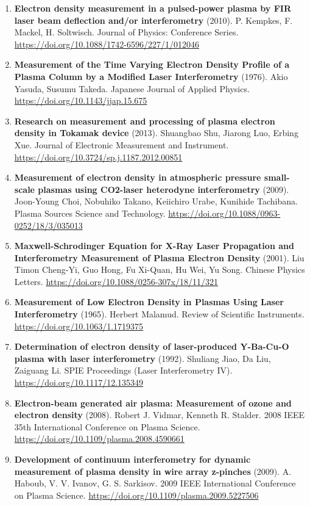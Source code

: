 \documentclass[11pt,a4paper]{article}
\begin{document}
\begin{enumerate}[leftmargin=1.4em]
\item \textbf{Electron density measurement in a pulsed-power plasma by FIR laser beam deflection and/or interferometry} (2010). P. Kempkes, F. Mackel, H. Soltwisch. Journal of Physics: Conference Series. \url{https://doi.org/10.1088/1742-6596/227/1/012046}
\item \textbf{Measurement of the Time Varying Electron Density Profile of a Plasma Column by a Modified Laser Interferometry} (1976). Akio Yasuda, Susumu Takeda. Japanese Journal of Applied Physics. \url{https://doi.org/10.1143/jjap.15.675}
\item \textbf{Research on measurement and processing of plasma electron density in Tokamak device} (2013). Shuangbao Shu, Jiarong Luo, Erbing Xue. Journal of Electronic Measurement and Instrument. \url{https://doi.org/10.3724/sp.j.1187.2012.00851}
\item \textbf{Measurement of electron density in atmospheric pressure small-scale plasmas using CO2-laser heterodyne interferometry} (2009). Joon-Young Choi, Nobuhiko Takano, Keiichiro Urabe, Kunihide Tachibana. Plasma Sources Science and Technology. \url{https://doi.org/10.1088/0963-0252/18/3/035013}
\item \textbf{Maxwell-Schrodinger Equation for X-Ray Laser Propagation and Interferometry Measurement of Plasma Electron Density} (2001). Liu Timon Cheng-Yi, Guo Hong, Fu Xi-Quan, Hu Wei, Yu Song. Chinese Physics Letters. \url{https://doi.org/10.1088/0256-307x/18/11/321}
\item \textbf{Measurement of Low Electron Density in Plasmas Using Laser Interferometry} (1965). Herbert Malamud. Review of Scientific Instruments. \url{https://doi.org/10.1063/1.1719375}
\item \textbf{Determination of electron density of laser-produced Y-Ba-Cu-O plasma with laser interferometry} (1992). Shuliang Jiao, Da Liu, Zaiguang Li. SPIE Proceedings (Laser Interferometry IV). \url{https://doi.org/10.1117/12.135349}
\item \textbf{Electron-beam generated air plasma: Measurement of ozone and electron density} (2008). Robert J. Vidmar, Kenneth R. Stalder. 2008 IEEE 35th International Conference on Plasma Science. \url{https://doi.org/10.1109/plasma.2008.4590661}
\item \textbf{Development of continuum interferometry for dynamic measurement of plasma density in wire array z-pinches} (2009). A. Haboub, V. V. Ivanov, G. S. Sarkisov. 2009 IEEE International Conference on Plasma Science. \url{https://doi.org/10.1109/plasma.2009.5227506}

\end{enumerate}
\end{document}

